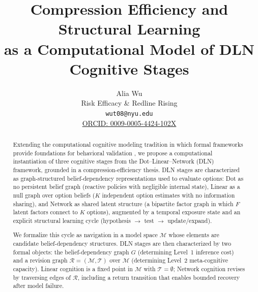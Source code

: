 \documentclass[11pt]{article}
\title{Compression Efficiency and Structural Learning\\as a Computational Model of DLN Cognitive Stages}
\author{
Alia Wu\\
Risk Efficacy \& Redline Rising\\
\texttt{wut08@nyu.edu}\\
\href{https://orcid.org/0009-0005-4424-102X}{ORCID: 0009-0005-4424-102X}
}
\date{}
\begin{document}
\maketitle

\begin{abstract}
Extending the computational cognitive modeling tradition in which formal frameworks provide foundations for behavioral validation \cite{Marr1982,Anderson2004,KempTenenbaum2008}, we propose a computational instantiation of three cognitive stages from the Dot--Linear--Network (DLN) framework, grounded in a compression-efficiency thesis. DLN stages are characterized as graph-structured belief-dependency representations used to evaluate options: Dot as no persistent belief graph (reactive policies with negligible internal state), Linear as a null graph over option beliefs ($K$ independent option estimates with no information sharing), and Network as shared latent structure (a bipartite factor graph in which $F$ latent factors connect to $K$ options), augmented by a temporal exposure state and an explicit structural learning cycle (hypothesis $\rightarrow$ test $\rightarrow$ update/expand).

We formalize this cycle as navigation in a model space $\mathcal{M}$ whose
elements are candidate belief-dependency structures.  DLN stages are then
characterized by two formal objects: the belief-dependency graph $G$
(determining Level~1 inference cost) and a revision graph
$\mathcal{R}=(\mathcal{M},\mathcal{T})$ over $\mathcal{M}$ (determining Level~2
meta-cognitive capacity).  Linear cognition is a fixed point in $\mathcal{M}$
with $\mathcal{T}=\emptyset$; Network cognition revises by traversing edges of
$\mathcal{R}$, including a return transition that enables bounded recovery after
model failure.


\end{abstract}
\end{document}
